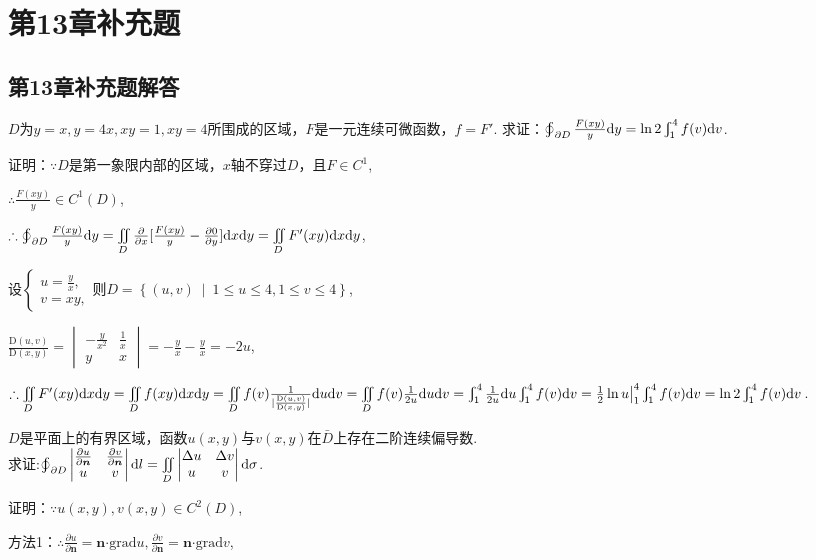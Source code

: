 \documentclass[12pt,UTF8]{ctexart}
\newcommand\Set[2]{\left\{#1\ \middle\vert\ #2 \right\}}
\newcommand{\Int}[4]{\varint\nolimits_{#1}^{#2}#3\mathrm d#4}
\newcommand{\IInt}[3]{\iint\limits_{#1}#2\mathrm d#3}
\newcommand{\varIInt}[4]{\iint\limits_{#1}#2\mathrm d#3\mathrm d#4}
\newcommand{\BLOInt}[2]{\varoint\nolimits_{#1}#2}
\newcommand{\md}[1]{\mathrm d#1}
\newcommand{\pp}[2]{\frac{\partial #1}{\partial #2}}
\newcommand{\ppy}[1]{\frac{\partial #1}{\partial y}}
\newcommand{\varppx}[1]{\frac{\partial}{\partial x} #1}
\newcommand{\m}[0]{\mathrm }
\begin{document}
\def\thesection{25C}
\section{第13章补充题}
\subsection{第13章补充题解答}
\begin{enumerate}
$D$为$y=x,y=4x,xy=1,xy=4$所围成的区域，$F$是一元连续可微函数，$f=F'$. 求证：$\BLOInt{\partial D}{\frac{F(xy)}y}\md y=\ln2\Int14{f(v)}v$.

证明：$\because D$是第一象限内部的区域，$x$轴不穿过$D$，且$F\in C^1$,

$\therefore\frac{F(xy)}y\in C^1(D)$,

$\therefore\BLOInt{\partial D}{\frac{F(xy)}y}\md y=\varIInt D{\varppx{[\frac{F(xy)}y}-\ppy0]}xy=\varIInt D{F'(xy)}xy$,

设$\begin{cases}u=\frac yx,\\v=xy,\end{cases}$则$D=\Set{(u,v)}{1\leqslant u\leqslant 4,1\leqslant v\leqslant 4}$,

$\frac{\m D(u,v)}{\m D(x,y)}=\begin{vmatrix}-\frac y{x^2}&\frac1x\\y&x\end{vmatrix}=-\frac yx-\frac yx=-2u$,

$\therefore\varIInt D{F'(xy)}xy=\varIInt D{f(xy)}xy=\varIInt D{f(v)\frac1{|\frac{\m D(u,v)}{\m D(x,y)}|}}uv=\varIInt D{f(v)\frac1{2u}}uv=\Int14{\frac1{2u}}u\Int14{f(v)}v\\
=\frac12\ln u\big|_1^4\Int14{f(v)}v=\ln2\Int14{f(v)}v$.

$D$是平面上的有界区域，函数$u(x,y)$与$v(x,y)$在$\bar D$上存在二阶连续偏导数. \\
求证:$\BLOInt{\partial D}{\begin{vmatrix}\frac{\partial u}{\partial\bm n}&\frac{\partial v}{\partial\bm n}\\ u&v\end{vmatrix}\md l}=\IInt D{\begin{vmatrix}\Delta u&\Delta v\\ u&v\end{vmatrix}}\sigma$.

证明：$\because u(x,y),v(x,y)\in C^2(D)$,

方法1：$\therefore\pp u{\bm n}=\bm n\bm\cdot\text{grad}u,\pp v{\bm n}=\bm n\bm\cdot\text{grad}v$,


\end{enumerate}
\end{document}
